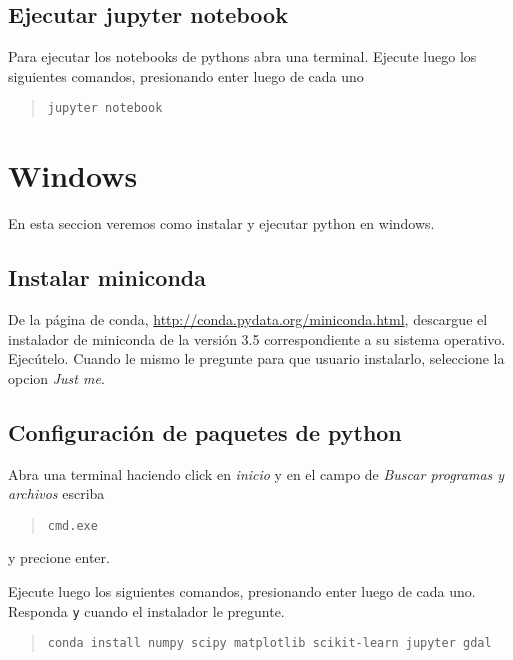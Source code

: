 \documentclass[hidelinks,12pt]{article}
\begin{document}
\subsection{Ejecutar jupyter notebook}
Para ejecutar los notebooks de pythons abra una terminal. Ejecute luego los 
siguientes comandos, presionando enter luego de cada uno

\begin{quote}
\begin{verbatim}
jupyter notebook
\end{verbatim}
\end{quote}

\section{Windows}
En esta seccion veremos como instalar y ejecutar python en windows.

\subsection{Instalar miniconda}

De la p\'agina de conda, \url{http://conda.pydata.org/miniconda.html}, descargue 
el instalador de miniconda de la versi\'on 3.5 correspondiente a su sistema
operativo. Ejec\'utelo. Cuando le mismo le pregunte para que usuario instalarlo,
seleccione la opcion \emph{Just me}.

\subsection{Configuraci\'on de paquetes de python}

Abra una terminal haciendo click en \emph{inicio} y en el campo de \emph{Buscar
programas y archivos} escriba 
\begin{quote}
\begin{verbatim}
cmd.exe
\end{verbatim}
\end{quote}
y precione enter.

Ejecute luego los siguientes comandos, presionando enter luego de cada uno. Responda 
\texttt{y} cuando el instalador le pregunte.

\begin{quote}
\begin{verbatim}
conda install numpy scipy matplotlib scikit-learn jupyter gdal
\end{verbatim}
\end{quote}
\end{document}
